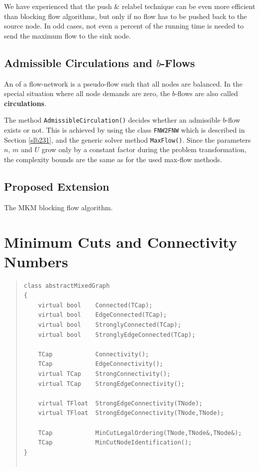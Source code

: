 \documentclass[a4paper,11pt,twoside]{book}
\begin{document}
\begin{multicols}{2}
We have experienced that the push \& relabel technique can be even more
efficient than blocking flow algorithms, but only if no flow has to be pushed
back to the source node. In odd cases, not even a percent of the running time
is needed to send the maximum flow to the sink node.


\subsection{Admissible Circulations and $b$-Flows}
An  of a flow-network is a pseudo-flow such that all nodes are
balanced. In the special situation where all node demands are zero,
the $b$-flows are also called {\bf circulations}.

The method \verb/AdmissibleCirculation()/ decides whether an admissible
$b$-flow exists or not. This is achieved by using the class \verb/FNW2FNW/
which is described in Section \ref{slb231}, and the generic solver method
\verb/MaxFlow()/. Since the parameters $n$, $m$ and $U$ grow only by a
constant factor during the problem transformation, the complexity bounds are
the same as for the used max-flow methods.


\subsection{Proposed Extension}
The MKM blocking flow algorithm.


\section{Minimum Cuts and Connectivity Numbers}
\label{slb_solve_mincut}
\methods
\begin{quote}
\begin{verbatim}
class abstractMixedGraph
{
    virtual bool    Connected(TCap);
    virtual bool    EdgeConnected(TCap);
    virtual bool    StronglyConnected(TCap);
    virtual bool    StronglyEdgeConnected(TCap);

    TCap            Connectivity();
    TCap            EdgeConnectivity();
    virtual TCap    StrongConnectivity();
    virtual TCap    StrongEdgeConnectivity();

    virtual TFloat  StrongEdgeConnectivity(TNode);
    virtual TFloat  StrongEdgeConnectivity(TNode,TNode);

    TCap            MinCutLegalOrdering(TNode,TNode&,TNode&);
    TCap            MinCutNodeIdentification();
}


\end{verbatim}
\end{quote}
\end{multicols}
\end{document}
